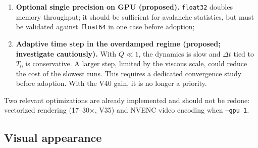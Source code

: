 \documentclass[11pt,a4paper]{article}
\newcommand{\code}[1]{\texttt{#1}}
\begin{document}
\begin{enumerate}
\emph{Validation}: parallel execution with 4 \emph{workers} produces CSVs bit-identical to serial execution; full resume (``nothing to do'') and partial resume (simulated interruption) work; the analysis script reads the V02 \emph{manifest} without changes. The time gain is expected to be approximately linear in the number of cores, not measurable in the one-core development environment and to be confirmed on the server;
\item \textbf{Optional single precision on GPU (proposed).} \code{float32} doubles memory throughput; it should be sufficient for avalanche statistics, but must be validated against \code{float64} in one case before adoption;
\item \textbf{Adaptive time step in the overdamped regime (proposed; investigate cautiously).} With $Q \ll 1$, the dynamics is slow and $\Delta t$ tied to $T_0$ is conservative. A larger step, limited by the viscous scale, could reduce the cost of the slowest runs. This requires a dedicated convergence study before adoption. With the V40 gain, it is no longer a priority.
\end{enumerate}

Two relevant optimizations are already implemented and should not be redone: vectorized rendering (17--30$\times$, V35) and NVENC video encoding when \code{--gpu 1}.

\subsection{Visual appearance}
\end{document}
